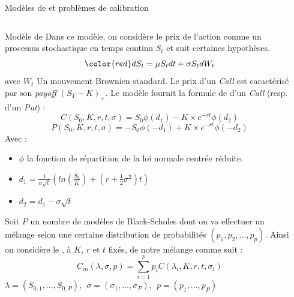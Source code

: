 \documentclass[final]{beamer}
\newlength{\onecolwid}
\newlength{\twocolwid}
\begin{document}
\begin{frame}[t]
\begin{columns}[t]
\begin{column}{\twocolwid}
\begin{block}{Modèles de  et problèmes de calibration}
\begin{columns}[t,totalwidth=\twocolwid]
\begin{column}{\onecolwid}
\begin{alertblock}{Modèle de }
  Dans ce modèle, on considère le prix de l'action comme un processus stochastique en temps continu $S_t$ et suit certaines hypothèses. \newline
  {
  \[ {\color{red} dS_t = \mu S_t dt + \sigma S_t dW_t} \]}
avec $W_t$ Un mouvement Brownien standard.
\newline
Le prix d'un \textit{Call} est caractérisé par son \textit{payoff} $(S_T - K)_{+}$. \newline
Le modèle fournit la formule de  d'un \textit{Call} (resp. d'un \textit{Put}) :
$$ C(S_0,K,r,t,\sigma) = S_0 \phi(d_1)-K \times e^{-rt} \phi(d_2) $$
$$ P(S_0,K,r,t,\sigma) = -S_0 \phi(-d_1)+K \times e^{-rt} \phi(-d_2) $$
Avec : \begin{itemize}
\item $\phi$ la fonction de répartition de la loi normale centrée réduite.
\item $d_1 = \frac{1}{\sigma \sqrt{t}} (ln(\frac{S_0}{K})+(r+\frac{1}{2}\sigma^2)t) $
\item $d_2 = d_1 - \sigma \sqrt{t}$
\end{itemize}
\end{alertblock}
Soit $P$ un nombre de modèles de Black-Scholes dont on va effectuer un mélange selon une certaine distribution de probabilités $(p_1,p_2,...,p_p)$.
\newline
Ainsi on considère le , à $K$, $r$ et $t$ fixés, de notre mélange comme suit :
$$ C_m(\lambda, \sigma, p) = \sum^p_{i=1} p_i C(\lambda_i,K,r,t,\sigma_i) $$
\vspace{-0.3cm}
$\lambda = (S_{0,1},...,S_{0,P}),\ \  \sigma = (\sigma_1,...,\sigma_P), \ \ p = (p_1,...,p_P)$

\end{column} %

\begin{column}{\onecolwid} %


\end{column}
\end{columns}
\end{block}
\end{column}
\end{columns}
\end{frame}
\end{document}
